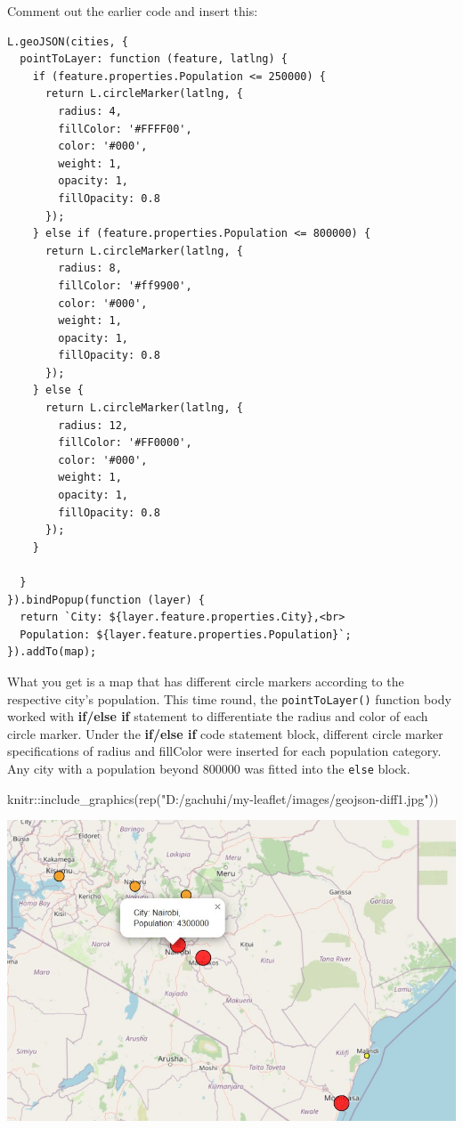 \documentclass[
]{book}
\newenvironment{Shaded}{\begin{snugshade}}{\end{snugshade}}
\newcommand{\FunctionTok}[1]{\textcolor[rgb]{0.00,0.00,0.00}{#1}}
\newcommand{\NormalTok}[1]{#1}
\newcommand{\SpecialCharTok}[1]{\textcolor[rgb]{0.00,0.00,0.00}{#1}}
\newcommand{\StringTok}[1]{\textcolor[rgb]{0.31,0.60,0.02}{#1}}
\begin{document}
Comment out the earlier code and insert this:

\begin{verbatim}
L.geoJSON(cities, {
  pointToLayer: function (feature, latlng) {
    if (feature.properties.Population <= 250000) {
      return L.circleMarker(latlng, {
        radius: 4,
        fillColor: '#FFFF00',
        color: '#000',
        weight: 1,
        opacity: 1,
        fillOpacity: 0.8  
      });
    } else if (feature.properties.Population <= 800000) {
      return L.circleMarker(latlng, {
        radius: 8,
        fillColor: '#ff9900',
        color: '#000',
        weight: 1,
        opacity: 1,
        fillOpacity: 0.8  
      });
    } else {
      return L.circleMarker(latlng, {
        radius: 12,
        fillColor: '#FF0000',
        color: '#000',
        weight: 1,
        opacity: 1,
        fillOpacity: 0.8  
      });
    }
    
  }
}).bindPopup(function (layer) {
  return `City: ${layer.feature.properties.City},<br>
  Population: ${layer.feature.properties.Population}`;
}).addTo(map);
\end{verbatim}

What you get is a map that has different circle markers according to the respective city's population. This time round, the \texttt{pointToLayer()} function body worked with \textbf{if/else if} statement to differentiate the radius and color of each circle marker. Under the \textbf{if/else if} code statement block, different circle marker specifications of radius and fillColor were inserted for each population category. Any city with a population beyond 800000 was fitted into the \texttt{else} block.

\begin{Shaded}
\begin{Highlighting}[]
\NormalTok{knitr}\SpecialCharTok{::}\FunctionTok{include\_graphics}\NormalTok{(}\FunctionTok{rep}\NormalTok{(}\StringTok{"D:/gachuhi/my{-}leaflet/images/geojson{-}diff1.jpg"}\NormalTok{))}
\end{Highlighting}
\end{Shaded}

\includegraphics[width=12.33in]{../images/geojson-diff1}
\end{document}

